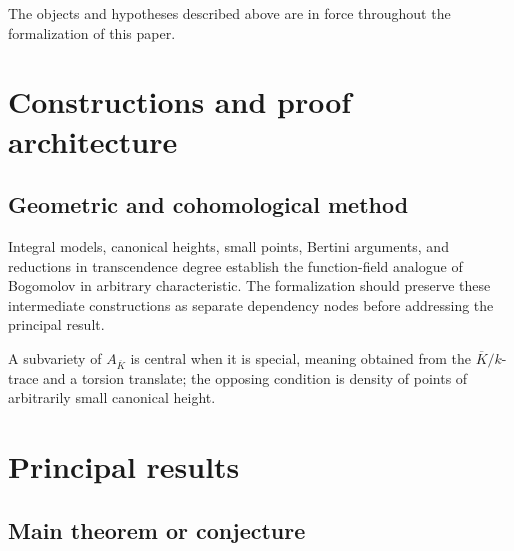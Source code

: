 \begin{convention}
\label{geometric-bogomolov-conjecture-arbitrary-characteristics-setup}
The objects and hypotheses described above are in force throughout the
formalization of this paper.
\notready
\end{convention}

\chapter{Constructions and proof architecture}
\label{chap:geometric-bogomolov-conjecture-arbitrary-characteristics-method}

\section{Geometric and cohomological method}
\label{sec:geometric-bogomolov-conjecture-arbitrary-characteristics-method}

Integral models, canonical heights, small points, Bertini arguments, and reductions in transcendence degree establish the function-field analogue of Bogomolov in arbitrary characteristic. The formalization should preserve these intermediate constructions
as separate dependency nodes before addressing the principal result.

\begin{definition}
\label{geometric-bogomolov-conjecture-arbitrary-characteristics-central-object}
A subvariety of $A_{\overline K}$ is central when it is special, meaning obtained from the $\overline K/k$-trace and a torsion translate; the opposing condition is density of points of arbitrarily small canonical height.
\notready
\end{definition}

\chapter{Principal results}
\label{chap:geometric-bogomolov-conjecture-arbitrary-characteristics-results}

\section{Main theorem or conjecture}
\label{sec:geometric-bogomolov-conjecture-arbitrary-characteristics-results}

